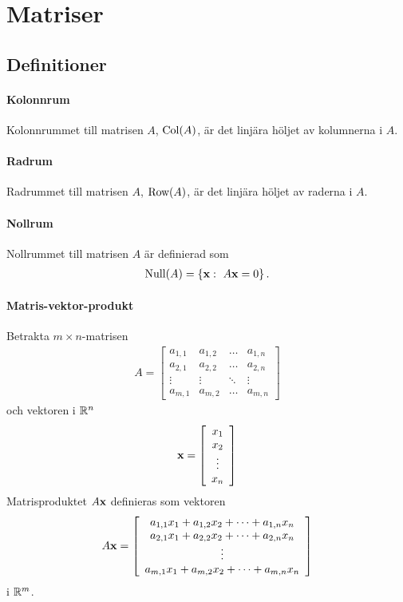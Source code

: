 \section{Matriser}

\subsection{Definitioner}

\paragraph{Kolonnrum}
Kolonnrummet till matrisen $A$, $\text{Col}(A)$, är det linjära höljet av kolumnerna i $A$.

\paragraph{Radrum}
Radrummet till matrisen $A$, $\text{Row}(A)$, är det linjära höljet av raderna i $A$.

\paragraph{Nollrum}
Nollrummet till matrisen $A$ är definierad som
\begin{align*}
	\Null{A} = \left\{\vect{x}:\ A\vect{x} = 0\right\}.
\end{align*}

\paragraph{Matris-vektor-produkt}
Betrakta $m\times n$-matrisen
\begin{align*}
	A =
	\left[\begin{array}{cccc}
    	a_{1,1} & a_{1,2} & \dots  & a_{1,n} \\
    	a_{2,1} & a_{2,2} & \dots  & a_{2,n} \\
    	\vdots  & \vdots  & \ddots & \vdots  \\
	    a_{m,1} & a_{m,2} & \dots  & a_{m,n}
	\end{array}\right]
\end{align*}
och vektoren i $\mathbb{R}^n$
\begin{align*}
	\vectorbold{x} =
	\left[\begin{array}{c}
    	x_1    \\
    	x_2    \\
    	\vdots \\
	    x_n
	\end{array}\right]
\end{align*}
Matrisproduktet $A\vectorbold{x}$ definieras som vektoren
\begin{align*}
	A\vectorbold{x} =
	\left[\begin{array}{c}
    	a_{1,1}x_1 + a_{1,2}x_2 + \dots + a_{1,n}x_n \\
    	a_{2,1}x_1 + a_{2,2}x_2 + \dots + a_{2,n}x_n \\
    	\vdots                                       \\
	    a_{m,1}x_1 + a_{m,2}x_2 + \dots + a_{m,n}x_n
	\end{array}\right]
\end{align*}
i $\mathbb{R}^m$.

